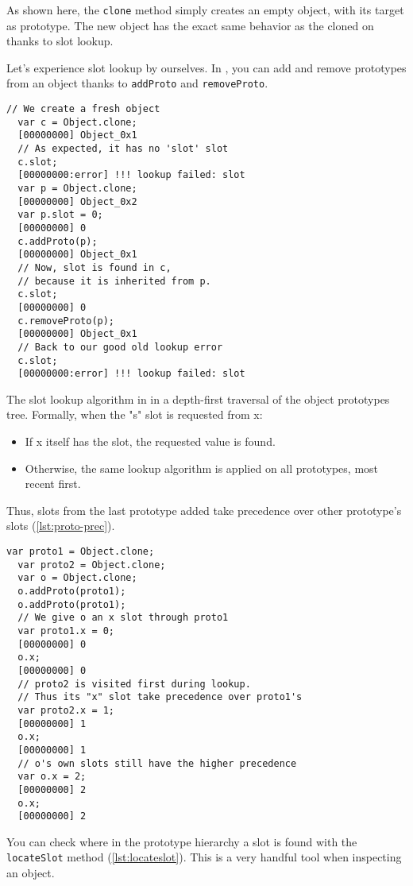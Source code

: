\documentclass[openright,twoside,12pt]{report}
\newcommand{\lst}[1]{\autoref{lst:#1}}
\begin{document}
As shown here, the \texttt{clone} method simply creates an empty
object, with its target as prototype. The new object has the exact
same behavior as the cloned on thanks to slot lookup.

Let's experience slot lookup by ourselves. In \urbi, you can add and
remove prototypes from an object thanks to \texttt{addProto} and
\texttt{removeProto}.

\begin{lstlisting}[caption=Manipulating prototypes, label=lst:proto-change]
  // We create a fresh object
  var c = Object.clone;
  [00000000] Object_0x1
  // As expected, it has no 'slot' slot
  c.slot;
  [00000000:error] !!! lookup failed: slot
  var p = Object.clone;
  [00000000] Object_0x2
  var p.slot = 0;
  [00000000] 0
  c.addProto(p);
  [00000000] Object_0x1
  // Now, slot is found in c,
  // because it is inherited from p.
  c.slot;
  [00000000] 0
  c.removeProto(p);
  [00000000] Object_0x1
  // Back to our good old lookup error
  c.slot;
  [00000000:error] !!! lookup failed: slot
\end{lstlisting}

The slot lookup algorithm in \urbi in a depth-first traversal of the
object prototypes tree. Formally, when the "s" slot is requested from
x:

\begin{itemize}
\item If x itself has the slot, the requested value is found.
\item Otherwise, the same lookup algorithm is applied on all
  prototypes, most recent first.
\end{itemize}

Thus, slots from the last prototype added take precedence over other
prototype's slots (\lst{proto-prec}).

\begin{lstlisting}[caption=Prototype precedence, label=lst:proto-prec]
  var proto1 = Object.clone;
  var proto2 = Object.clone;
  var o = Object.clone;
  o.addProto(proto1);
  o.addProto(proto1);
  // We give o an x slot through proto1
  var proto1.x = 0;
  [00000000] 0
  o.x;
  [00000000] 0
  // proto2 is visited first during lookup.
  // Thus its "x" slot take precedence over proto1's
  var proto2.x = 1;
  [00000000] 1
  o.x;
  [00000000] 1
  // o's own slots still have the higher precedence
  var o.x = 2;
  [00000000] 2
  o.x;
  [00000000] 2
\end{lstlisting}

You can check where in the prototype hierarchy a slot is found with
the \texttt{locateSlot} method (\lst{locateslot}). This is a very
handful tool when inspecting an object.
\end{document}
